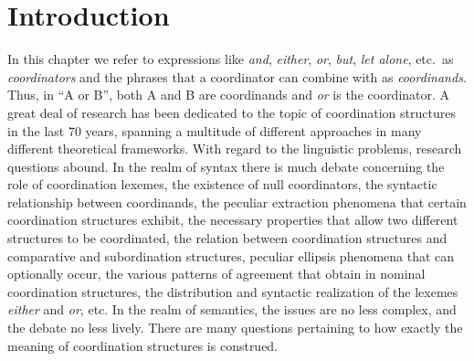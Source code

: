 




\maketitle
\label{chap-coordination}



\section{Introduction} 

In this chapter we refer to expressions like \emph{and}, \emph{either},  \emph{or}, \emph{but}, 
\emph{let alone}, etc.\ as \emph{coordinators} and the phrases that a coordinator can combine with as  \emph{coordinands}.
Thus,  in ``A or B'', both A and B are coordinands and \emph{or} is the coordinator. 
A great deal of research has been dedicated to the topic of coordination structures in the last  70 years, spanning a multitude of different approaches in many different theoretical frameworks.  With regard to the linguistic problems, research questions abound. In the realm of syntax there is much debate concerning the role of coordination lexemes, the existence of null coordinators, the syntactic relationship between coordinands, the peculiar extraction phenomena that certain coordination structures exhibit, the necessary properties that allow two different structures to be coordinated, the relation between coordination structures and comparative and subordination structures, peculiar ellipsis phenomena that can optionally occur, the various patterns of agreement that obtain in nominal coordination structures, the distribution and syntactic realization of the lexemes \emph{either} and \emph{or}, etc. In the realm of semantics, the issues are no less complex, and the debate no less lively. There are many questions pertaining to how exactly the meaning of coordination structures is construed. 

